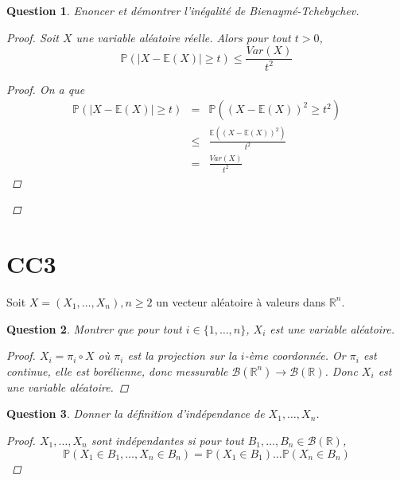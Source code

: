 \documentclass{article}
\theoremstyle{plain}
\newtheorem{question}{Question}
\theoremstyle{definition}
\begin{document}
\begin{question}
	Enoncer et démontrer l'inégalité de Bienaymé-Tchebychev.
	\begin{proof}
		Soit $X$ une variable aléatoire réelle. Alors pour tout $t > 0$,
		\begin{equation*}
			\mathbb{P} (|X - \mathbb{E} (X)| \geq t) \le \frac{Var(X)}{t^2}
		\end{equation*}
		\begin{proof}
			On a que
			\begin{eqnarray*}
				\mathbb{P} (|X - \mathbb{E} (X)| \geq t) &=& \mathbb{P} ((X - \mathbb{E} (X))^2 \geq t^2) \\
				&\le& \frac{\mathbb{E} ((X - \mathbb{E} (X))^2)}{t^2} \\
				&=& \frac{Var(X)}{t^2}
			\end{eqnarray*}
		\end{proof}
	\end{proof}
\end{question}



\section{CC3}

Soit $X = (X_1, \dots, X_n), n \geq 2$ un vecteur aléatoire à valeurs dans $\mathbb{R}^n$.

\begin{question}
	Montrer que pour tout $i \in \{1, \dots, n\}$, $X_i$ est une variable aléatoire.
	\begin{proof}
		$X_i = \pi_i \circ X$ où $\pi_i$ est la projection sur la $i$-ème coordonnée. Or $\pi_i$ est continue,
		elle est borélienne, donc messurable $\mathscr{B} (\mathbb{R}^n) \to \mathscr{B} (\mathbb{R})$.
		Donc $X_i$ est une variable aléatoire.
	\end{proof}
\end{question}

\begin{question}
	Donner la définition d'indépendance de $X_1, \dots, X_n$.
	\begin{proof}
		$X_1, \dots, X_n$ sont indépendantes si pour tout $B_1, \dots, B_n \in \mathscr{B} (\mathbb{R})$,
		\begin{equation*}
			\mathbb{P} (X_1 \in B_1, \dots, X_n \in B_n) = \mathbb{P} (X_1 \in B_1) \dots \mathbb{P} (X_n \in B_n)
		\end{equation*}
	\end{proof}
\end{question}
\end{document}
